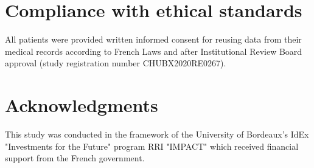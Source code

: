 \documentclass{article}
\begin{document}
\vfill
\pagebreak



\section{Compliance with ethical standards}
\label{sec:ethics}
All patients were provided written informed consent for reusing data from their medical records according to French Laws and after Institutional Review Board approval (study registration number CHUBX2020RE0267). 



\section{Acknowledgments}
\label{sec:acknowledgments}
This study was conducted in the framework of the University of Bordeaux's IdEx "Investments for the Future" program RRI "IMPACT" which received financial support from the French government.  

 


\end{document}
